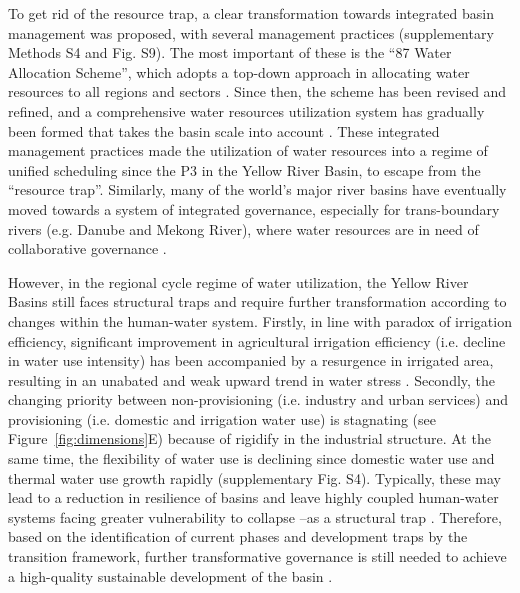 \documentclass[9pt, twocolumn, twoside, lineno]{pnas-new}
\begin{document}
To get rid of the resource trap, a clear transformation towards integrated basin management was proposed, with several management practices (supplementary Methods S4 and Fig. S9). The most important of these is the “87 Water Allocation Scheme”, which adopts a top-down approach in allocating water resources to all regions and sectors \cite{wangThirtyYearsYellow2018}. Since then, the scheme has been revised and refined, and a comprehensive water resources utilization system has gradually been formed that takes the basin scale into account \cite{wangThirtyYearsYellow2018}. These integrated management practices made the utilization of water resources into a regime of unified scheduling since the P3 in the Yellow River Basin, to escape from the “resource trap”. Similarly, many of the world's major river basins have eventually moved towards a system of integrated governance, especially for trans-boundary rivers (e.g. Danube and Mekong River), where water resources are in need of collaborative governance \cite{bodinCollaborativeEnvironmentalGovernance2017a}.


However, in the regional cycle regime of water utilization, the Yellow River Basins still faces structural traps and require further transformation according to changes within the human-water system. 
Firstly, in line with paradox of irrigation efficiency, significant improvement in agricultural irrigation efficiency (i.e. decline in water use intensity) has been accompanied by a resurgence in irrigated area, resulting in an unabated and weak upward trend in water stress \cite{graftonParadoxIrrigationEfficiency2018}.
Secondly, the changing priority between non-provisioning (i.e. industry and urban services) and provisioning (i.e. domestic and irrigation water use) is stagnating (see Figure~\ref{fig:dimensions}E) because of rigidify in the industrial structure. 
At the same time, the flexibility of water use is declining since domestic water use and thermal water use growth rapidly (supplementary Fig. S4). 
Typically, these may lead to a reduction in resilience of basins and leave highly coupled human-water systems facing greater vulnerability to collapse --as a structural trap \cite{cummingResilienceBigRiver2011}. Therefore, based on the identification of current phases and development traps by the transition framework, further transformative governance is still needed to achieve a high-quality sustainable development of the basin \cite{scoonesTransformationsSustainabilityCombining2020a}.
\end{document}
